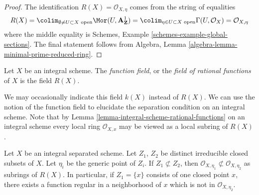 \begin{proof}
The identification $R(X) = \mathcal{O}_{X, \eta}$ comes from the
string of equalities
$$
R(X) = \colim_{\emptyset \not = U \subset X\text{ open}}
\Mor(U, \mathbf{A}^1_\mathbf{Z}) =
\colim_{\eta \in U \subset X\text{ open}}
\Gamma(U, \mathcal{O}_X) = \mathcal{O}_{X, \eta}
$$
where the middle equality is
Schemes, Example \ref{schemes-example-global-sections}.
The final statement follows from
Algebra, Lemma \ref{algebra-lemma-minimal-prime-reduced-ring}.
\end{proof}

\begin{definition}
\label{definition-function-field}
Let $X$ be an integral scheme.
The {\it function field}, or the {\it field of rational functions}
of $X$ is the field $R(X)$.
\end{definition}

\noindent
We may occasionally indicate this field $k(X)$ instead of $R(X)$.
We can use the notion of the function field to elucidate the
separation condition on an integral scheme.
Note that by Lemma \ref{lemma-integral-scheme-rational-functions}
on an integral scheme every local ring $\mathcal{O}_{X, x}$ may be viewed
as a local subring of $R(X)$.

\begin{lemma}
\label{lemma-distinct-local-rings}
Let $X$ be an integral separated scheme.
Let $Z_1$, $Z_2$ be distinct irreducible closed subsets of $X$.
Let $\eta_i$ be the generic point of $Z_i$.
If $Z_1 \not\subset Z_2$, then
$\mathcal{O}_{X, \eta_1} \not \subset \mathcal{O}_{X, \eta_2}$
as subrings of $R(X)$.
In particular, if $Z_1 = \{x\}$ consists of one closed point $x$,
there exists a function regular in a neighborhood of $x$
which is not in $\mathcal{O}_{X, \eta_{2}}$.
\end{lemma}

